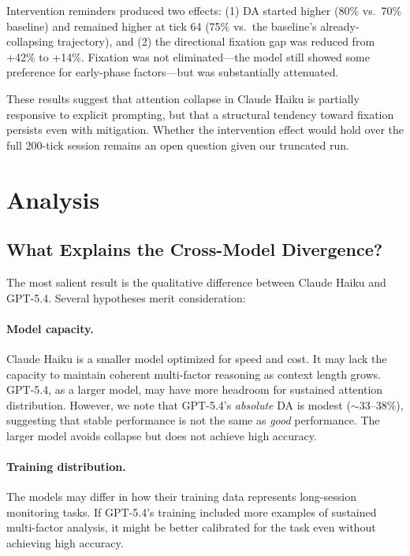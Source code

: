 \documentclass{article}
\begin{document}
Intervention reminders produced two effects: (1) DA started higher
(80\% vs.\ 70\% baseline) and remained higher at tick 64 (75\% vs.\
the baseline's already-collapsing trajectory), and (2) the directional
fixation gap was reduced from +42\% to +14\%. Fixation was not
eliminated---the model still showed some preference for early-phase
factors---but was substantially attenuated.

These results suggest that attention collapse in Claude Haiku is
partially responsive to explicit prompting, but that a structural
tendency toward fixation persists even with mitigation. Whether the
intervention effect would hold over the full 200-tick session remains an
open question given our truncated run.

\section{Analysis}
\label{sec:analysis}

\subsection{What Explains the Cross-Model Divergence?}

The most salient result is the qualitative difference between Claude
Haiku and GPT-5.4. Several hypotheses merit consideration:

\paragraph{Model capacity.} Claude Haiku is a smaller model optimized
for speed and cost. It may lack the capacity to maintain coherent
multi-factor reasoning as context length grows. GPT-5.4, as a larger
model, may have more headroom for sustained attention distribution.
However, we note that GPT-5.4's \emph{absolute} DA is modest
($\sim$33--38\%), suggesting that stable performance is not the same as
\emph{good} performance. The larger model avoids collapse but does not
achieve high accuracy.

\paragraph{Training distribution.} The models may differ in how their
training data represents long-session monitoring tasks. If GPT-5.4's
training included more examples of sustained multi-factor analysis, it
might be better calibrated for the task even without achieving high
accuracy.
\end{document}
